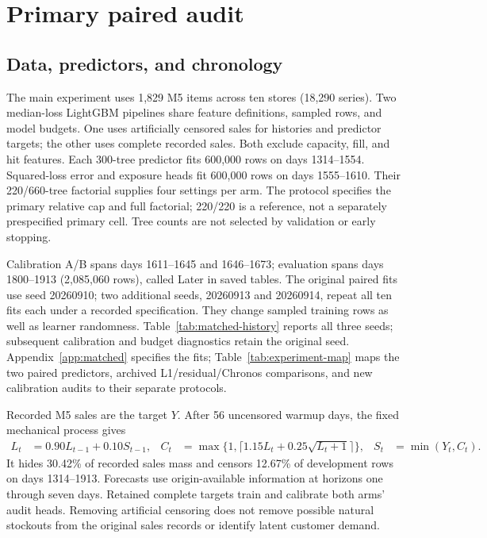 \documentclass{article}
\begin{document}
\section{Primary paired audit}
\subsection{Data, predictors, and chronology}
The main experiment uses 1,829 M5 items across ten stores (18,290 series). Two median-loss LightGBM pipelines share feature definitions, sampled rows, and model budgets. One uses artificially censored sales for histories and predictor targets; the other uses complete recorded sales. Both exclude capacity, fill, and hit features. Each 300-tree predictor fits 600,000 rows on days 1314--1554. Squared-loss error and exposure heads fit 600,000 rows on days 1555--1610. Their 220/660-tree factorial supplies four settings per arm. The protocol specifies the primary relative cap and full factorial; 220/220 is a reference, not a separately prespecified primary cell. Tree counts are not selected by validation or early stopping.

Calibration A/B spans days 1611--1645 and 1646--1673; evaluation spans days 1800--1913 (2,085,060 rows), called Later in saved tables. The original paired fits use seed 20260910; two additional seeds, 20260913 and 20260914, repeat all ten fits each under a recorded specification. They change sampled training rows as well as learner randomness. Table~\ref{tab:matched-history} reports all three seeds; subsequent calibration and budget diagnostics retain the original seed. Appendix~\ref{app:matched} specifies the fits; Table~\ref{tab:experiment-map} maps the two paired predictors, archived L1/residual/Chronos comparisons, and new calibration audits to their separate protocols.

Recorded M5 sales are the target $Y$. After 56 uncensored warmup days, the fixed mechanical process gives
\begin{align}
 L_t&=0.90L_{t-1}+0.10S_{t-1},&
 C_t&=\max\{1,\lceil1.15L_t+0.25\sqrt{L_t+1}\rceil\},&
 S_t&=\min(Y_t,C_t).
 \label{eq:censor}
\end{align}
It hides 30.42\% of recorded sales mass and censors 12.67\% of development rows on days 1314--1913. Forecasts use origin-available information at horizons one through seven days. Retained complete targets train and calibrate both arms' audit heads. Removing artificial censoring does not remove possible natural stockouts from the original sales records or identify latent customer demand.
\end{document}
